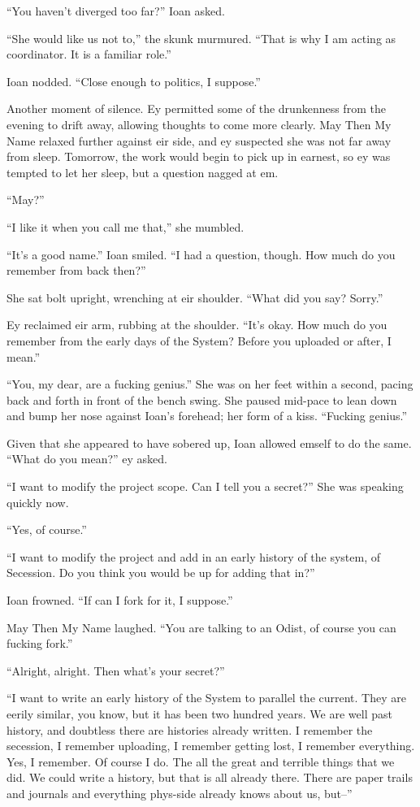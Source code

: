 ``You haven't diverged too far?'' Ioan asked.

``She would like us not to,'' the skunk murmured. ``That is why I am acting as coordinator. It is a familiar role.''

Ioan nodded. ``Close enough to politics, I suppose.''

Another moment of silence. Ey permitted some of the drunkenness from the evening to drift away, allowing thoughts to come more clearly. May Then My Name relaxed further against eir side, and ey suspected she was not far away from sleep. Tomorrow, the work would begin to pick up in earnest, so ey was tempted to let her sleep, but a question nagged at em.

``May?''

``I like it when you call me that,'' she mumbled.

``It's a good name.'' Ioan smiled. ``I had a question, though. How much do you remember from back then?''

She sat bolt upright, wrenching at eir shoulder. ``What did you say? Sorry.''

Ey reclaimed eir arm, rubbing at the shoulder. ``It's okay. How much do you remember from the early days of the System? Before you uploaded or after, I mean.''

``You, my dear, are a fucking genius.'' She was on her feet within a second, pacing back and forth in front of the bench swing. She paused mid-pace to lean down and bump her nose against Ioan's forehead; her form of a kiss. ``Fucking genius.''

Given that she appeared to have sobered up, Ioan allowed emself to do the same. ``What do you mean?'' ey asked.

``I want to modify the project scope. Can I tell you a secret?'' She was speaking quickly now.

``Yes, of course.''

``I want to modify the project and add in an early history of the system, of Secession. Do you think you would be up for adding that in?''

Ioan frowned. ``If can I fork for it, I suppose.''

May Then My Name laughed. ``You are talking to an Odist, of course you can fucking fork.''

``Alright, alright. Then what's your secret?''

``I want to write an early history of the System to parallel the current. They are eerily similar, you know, but it has been two hundred years. We are well past history, and doubtless there are histories already written. I remember the secession, I remember uploading, I remember getting lost, I remember everything. Yes, I remember. Of course I do. The all the great and terrible things that we did. We could write a history, but that is all already there. There are paper trails and journals and everything phys-side already knows about us, but--''

